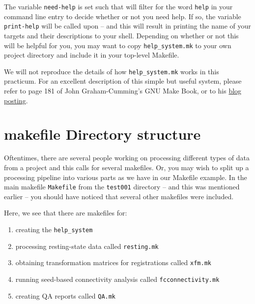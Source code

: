 The variable \texttt{need-help} is set such that \maken{} will filter for the word \texttt{help} in your command line entry to decide whether or not you need help. If so, the variable \texttt{print-help} will be called upon -- and this will result in \maken{} printing the name of your targets and their descriptions to your shell. Depending on whether or not this will be helpful for you, you may want to copy \texttt{help_system.mk} to your own project directory and include it in your top-level Makefile. 

We will not reproduce the details of how \texttt{help_system.mk} works in this practicum. For an excellent description of this simple but useful system, please refer to page 181 of John Graham-Cumming's GNU Make Book, or to his \href{http://www.cmcrossroads.com/article/self-documenting-makefiles}{blog posting}.  

\section{makefile Directory structure}
Oftentimes, there are several people working on processing different types of data from a project and this calls for several makefiles. Or, you may wish to split up a processing pipeline into various parts as we have in our Makefile example. In the main makefile \texttt{Makefile} from the \texttt{test001} directory -- and this was mentioned earlier -- you should have noticed that several other makefiles were included. 


Here, we see that there are makefiles for:
\begin{enumerate}
\item creating the \maken{} \texttt{help_system}
\item processing resting-state data called \texttt{resting.mk}
\item obtaining transformation matrices for registrations called \texttt{xfm.mk}
\item running seed-based connectivity analysis called \texttt{fcconnectivity.mk}
\item creating QA reports called \texttt{QA.mk}
\end{enumerate} 


